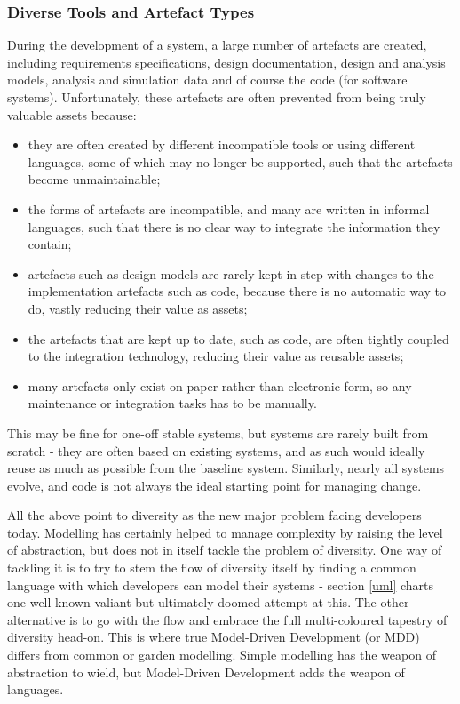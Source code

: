 \subsubsection{Diverse Tools and Artefact Types}

During the development of a system, a large number of artefacts are created, including requirements specifications, design documentation, design and analysis models, analysis and simulation data and of course the code (for software systems). Unfortunately, these artefacts are often prevented from being truly valuable assets because:
\begin{itemize}
\item they are often created by different incompatible tools or using different languages, some of which may no longer be supported, such that the artefacts become unmaintainable;
\item the forms of artefacts are incompatible, and many are written in informal languages, such that there is no clear way to integrate the information they contain;
\item artefacts such as design models are rarely kept in step with changes to the implementation artefacts such as code, because there is no automatic way to do, vastly reducing their value as assets;
\item the artefacts that are kept up to date, such as code, are often tightly coupled to the integration technology, reducing their value as reusable assets;
\item many artefacts only exist on paper rather than electronic form, so any maintenance or integration tasks has to be manually.
\end{itemize}
This may be fine for one-off stable systems, but systems are rarely built from scratch - they are often based on existing systems, and as such would ideally reuse as much as possible from the baseline system. Similarly, nearly all systems evolve, and code is not always the ideal starting point for managing change.

\vspace{1cm}
\noindent
All the above point to diversity as the new major problem facing developers today. Modelling has certainly helped to manage complexity by raising the level of abstraction, but does not in itself tackle the problem of diversity. One way of tackling it is to try to stem the flow of diversity itself by finding a common language with which developers can model their systems - section \ref{uml} charts one well-known valiant but ultimately doomed attempt at this. The other alternative is to go with the flow and embrace the full multi-coloured tapestry of diversity head-on. This is where true Model-Driven Development (or MDD) differs from common or garden modelling. Simple modelling has the weapon of abstraction to wield, but Model-Driven Development adds the weapon of languages.


